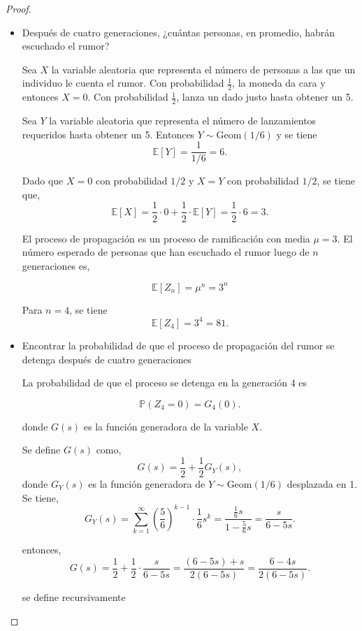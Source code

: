 \documentclass{article}
\begin{document}
\begin{proof}
\begin{itemize}

\item[(a)] Después de cuatro generaciones, ¿cuántas personas, en promedio, habrán escuchado el rumor?

Sea \( X \) la variable aleatoria que representa el número de personas a las que un individuo le cuenta el rumor. Con probabilidad \( \frac{1}{2} \), la moneda da cara y entonces \( X = 0 \). Con probabilidad \( \frac{1}{2} \), lanza un dado justo hasta obtener un 5. 

Sea \( Y \) la variable aleatoria que representa el número de lanzamientos requeridos hasta obtener un 5. Entonces \( Y \sim \text{Geom}(1/6) \) y se tiene
\[
\mathbb{E}[Y] = \frac{1}{1/6} = 6.
\]

Dado que \( X = 0 \) con probabilidad \( 1/2 \) y \( X = Y \) con probabilidad \( 1/2 \), se tiene que,
\[
\mathbb{E}[X] = \frac{1}{2} \cdot 0 + \frac{1}{2} \cdot \mathbb{E}[Y] = \frac{1}{2} \cdot 6 = 3.
\]

El proceso de propagación es un proceso de ramificación con media \( \mu = 3 \). El número esperado de personas que han escuchado el rumor luego de \( n \) generaciones es,

\[ \mathbb{E}[Z_n] = \mu^n = 3^n \]

Para \( n = 4 \), se tiene
\[
\mathbb{E}[Z_4] = 3^4 = 81.
\]

\item[(b)] Encontrar la probabilidad de que el proceso de propagación del rumor se detenga después de cuatro generaciones

La probabilidad de que el proceso se detenga en la generación 4 es

\[\mathbb{P}(Z_4 = 0) = G_4(0). \]

donde \( G(s) \) es la función generadora de la variable \( X \).

Se define \( G(s) \) como,
\[
G(s) = \frac{1}{2} + \frac{1}{2} G_Y(s),
\]
donde \( G_Y(s) \) es la función generadora de \( Y \sim \text{Geom}(1/6) \) desplazada en 1. Se tiene,
\[
G_Y(s) = \sum_{k = 1}^{\infty} \left(\frac{5}{6}\right)^{k - 1} \cdot \frac{1}{6} s^k = \frac{\frac{1}{6} s}{1 - \frac{5}{6}s} = \frac{s}{6 - 5s}.
\]

entonces,
\[
G(s) = \frac{1}{2} + \frac{1}{2} \cdot \frac{s}{6 - 5s} = \frac{(6 - 5s) + s}{2(6 - 5s)} = \frac{6 - 4s}{2(6 - 5s)}.
\]

se define recursivamente 


\end{itemize}
\end{proof}
\end{document}
